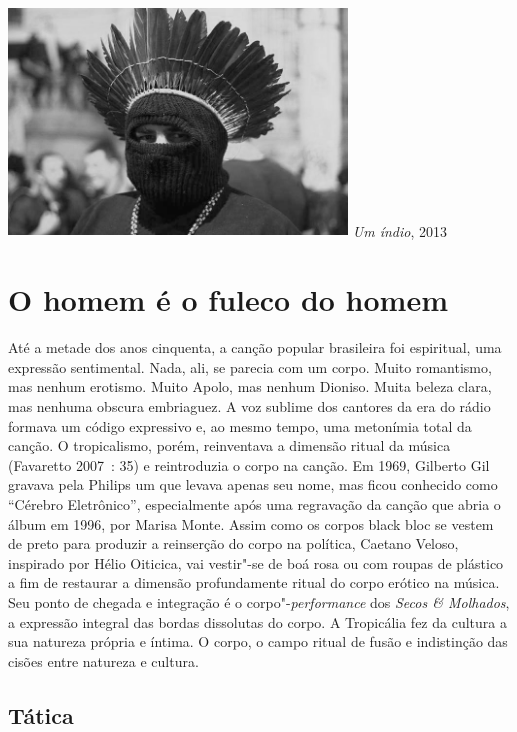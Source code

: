 \begin{center}
\includegraphics[width=9cm,height=6.1cm]{Imgs/img9.jpg}
\emph{Um índio}, 2013
\end{center}

\section{O homem é o fuleco do homem}

Até a metade dos anos cinquenta, a canção popular brasileira foi
espiritual, uma expressão sentimental. Nada, ali, se parecia com um
corpo. Muito romantismo, mas nenhum erotismo. Muito Apolo, mas nenhum
Dioniso. Muita beleza clara, mas nenhuma obscura embriaguez. A voz
sublime dos cantores da era do rádio formava um código expressivo e, ao
mesmo tempo, uma metonímia total da canção. O tropicalismo, porém,
reinventava a dimensão ritual da música (Favaretto 2007~: 35) e
reintroduzia o corpo na canção. Em 1969, Gilberto Gil gravava pela
Philips um  que levava apenas seu nome, mas ficou conhecido como
``Cérebro Eletrônico'', especialmente após uma regravação da canção que
abria o álbum em 1996, por Marisa Monte. Assim como os corpos black bloc
se vestem de preto para produzir a reinserção do corpo na política,
Caetano Veloso, inspirado por Hélio Oiticica, vai vestir"-se de boá rosa
ou com roupas de plástico a fim de restaurar a dimensão profundamente
ritual do corpo erótico na música. Seu ponto de chegada e integração é o
corpo"-\emph{performance} dos \emph{Secos \& Molhados}, a expressão
integral das bordas dissolutas do corpo. A Tropicália fez da cultura a
sua natureza própria e íntima. O corpo, o campo ritual de fusão e
indistinção das cisões entre natureza e cultura.

 

\subsection{Tática}

